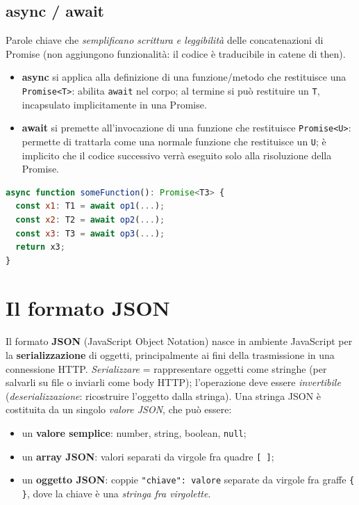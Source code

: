 \subsection{async / await}
\begin{definizione}
Parole chiave che \emph{semplificano scrittura e leggibilit\`a} delle concatenazioni di
Promise (non aggiungono funzionalit\`a: il codice \`e traducibile in catene di then).
\begin{itemize}
  \item \textbf{async} si applica alla definizione di una funzione/metodo che restituisce
        una \texttt{Promise<T>}: abilita \texttt{await} nel corpo; al termine si pu\`o
        restituire un \texttt{T}, incapsulato implicitamente in una Promise.
  \item \textbf{await} si premette all'invocazione di una funzione che restituisce
        \texttt{Promise<U>}: permette di trattarla come una normale funzione che restituisce
        un \texttt{U}; \`e implicito che il codice successivo verr\`a eseguito solo alla
        risoluzione della Promise.
\end{itemize}
\begin{lstlisting}[language=JavaScript]
async function someFunction(): Promise<T3> {
  const x1: T1 = await op1(...);
  const x2: T2 = await op2(...);
  const x3: T3 = await op3(...);
  return x3;
}
\end{lstlisting}
\end{definizione}

\section{Il formato JSON}

\begin{definizione}[JSON]
Il formato \textbf{JSON} (JavaScript Object Notation) nasce in ambiente JavaScript per la
\textbf{serializzazione} di oggetti, principalmente ai fini della trasmissione in una
connessione HTTP. \emph{Serializzare} = rappresentare oggetti come stringhe (per salvarli su
file o inviarli come body HTTP); l'operazione deve essere \emph{invertibile}
(\emph{deserializzazione}: ricostruire l'oggetto dalla stringa). Una stringa JSON \`e
costituita da un singolo \emph{valore JSON}, che pu\`o essere:
\begin{itemize}
  \item un \textbf{valore semplice}: number, string, boolean, \texttt{null};
  \item un \textbf{array JSON}: valori separati da virgole fra quadre \texttt{[ ]};
  \item un \textbf{oggetto JSON}: coppie \texttt{"chiave": valore} separate da virgole fra
        graffe \texttt{\{ \}}, dove la chiave \`e una \emph{stringa fra virgolette}.
\end{itemize}
\end{definizione}

